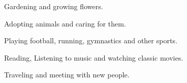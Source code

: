 \cventrytwo
{
\begin{cvitemsone}
\item {Gardening and growing flowers.}
\item {Adopting animals and caring for them.}
\item {Playing football, running, gymnastics and other sports.}
\item {Reading, Listening to music and watching classic movies.}
\item {Traveling and meeting with new people.}
\end{cvitemsone}
}

\vspace{+1mm}
